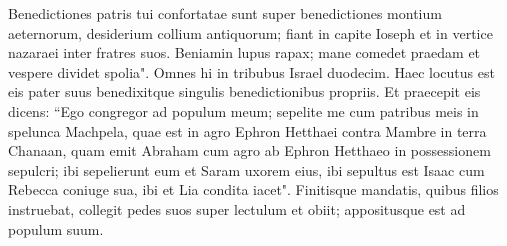 \begin{biblechapter}
\verse Benedictiones patris tui confortatae sunt super benedictiones montium aeternorum, desiderium collium antiquorum; fiant in capite Ioseph et in vertice nazaraei inter fratres suos. 
\verse Beniamin lupus rapax; mane comedet praedam et vespere dividet spolia". 
\verse Omnes hi in tribubus Israel duodecim. Haec locutus est eis pater suus benedixitque singulis benedictionibus propriis. 
\verse Et praecepit eis dicens: “Ego congregor ad populum meum; sepelite me cum patribus meis in spelunca Machpela, quae est in agro Ephron Hetthaei 
\verse contra Mambre in terra Chanaan, quam emit Abraham cum agro ab Ephron Hetthaeo in possessionem sepulcri; 
\verse ibi sepelierunt eum et Saram uxorem eius, ibi sepultus est Isaac cum Rebecca coniuge sua, ibi et Lia condita iacet". 
\verse Finitisque mandatis, quibus filios instruebat, collegit pedes suos super lectulum et obiit; appositusque est ad populum suum. 
\end{biblechapter}

